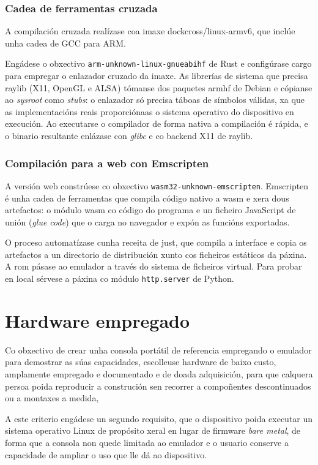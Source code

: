 \subsubsection{Cadea de ferramentas cruzada}
A compilación cruzada realízase coa
imaxe dockcross/linux-armv6, que inclúe unha cadea de GCC para ARM.

Engádese o obxectivo \texttt{arm-unknown-linux-gnueabihf} de Rust
e configúrase cargo para empregar o enlazador cruzado da imaxe.
As librerías de sistema que precisa raylib (X11, OpenGL e ALSA)
tómanse dos paquetes armhf de Debian e cópianse ao \textit{sysroot} como \textit{stubs}:
o enlazador só precisa táboas de símbolos válidas,
xa que as implementacións reais proporciónaas o sistema operativo do dispositivo en execución.
Ao executarse o compilador de forma nativa a compilación é rápida,
e o binario resultante enlázase con \textit{glibc} e co backend X11 de raylib.


\subsubsection{Compilación para a web con Emscripten}
A versión web constrúese co obxectivo \texttt{wasm32-unknown-emscripten}.
Emscripten~\cite{emscripten}
é unha cadea de ferramentas que compila código nativo a \acrshort{wasm}
e xera dous artefactos: o módulo \acrshort{wasm} co código do programa
e un ficheiro JavaScript de unión (\textit{glue code})
que o carga no navegador e expón as funcións exportadas.

O proceso automatízase cunha receita de just,
que compila a interface e copia os artefactos a un directorio de distribución
xunto cos ficheiros estáticos da páxina.
A \acrshort{rom} pásase ao emulador a través do sistema de ficheiros virtual.
Para probar en local sérvese a páxina co módulo \texttt{http.server} de Python.


\section{Hardware empregado}
\label{sec:hardware-empregado}
Co obxectivo de crear unha consola portátil de referencia empregando o emulador para demostrar as súas capacidades,
escolleuse hardware de baixo custo, amplamente empregado e documentado e de doada adquisición,
para que calquera persoa poida reproducir a construción sen recorrer a compoñentes descontinuados ou a montaxes a medida,

A este criterio engádese un segundo requisito, que o dispositivo poida executar un sistema operativo Linux
de propósito xeral en lugar de firmware \textit{bare metal},
de forma que a consola non quede limitada ao emulador
e o usuario conserve a capacidade de ampliar o uso que lle dá ao dispositivo.

